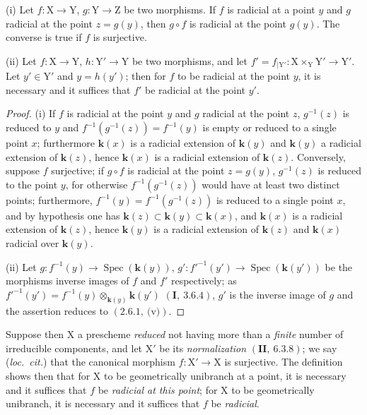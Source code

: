 \begin{lemma}[6.15.3.1]
\label{IV.6.15.3.1}
(i) Let $f:\mathrm{X}\to\mathrm{Y}$, $g:\mathrm{Y}\to\mathrm{Z}$ be two morphisms. If $f$ is radicial
at a point $y$ and $g$ radicial at the point $z=g(y)$, then $g\circ f$ is radicial at the point $g(y)$. The converse
is true if $f$ is surjective.

(ii) Let $f:\mathrm{X}\to\mathrm{Y}$, $h:\mathrm{Y}'\to\mathrm{Y}$ be two morphisms, and let $f'=f_{|\mathrm{Y}'}:\mathrm{X}\times_\mathrm{Y}\mathrm{Y}'\to\mathrm{Y}'$.
Let $y'\in\mathrm{Y}'$ and $y=h(y')$; then for $f$ to be radicial at the point $y$, it is necessary and it suffices that $f'$ be
radicial at the point $y'$.
\end{lemma}

\begin{proof}
(i) If $f$ is radicial at the point $y$ and $g$ radicial at the point $z$, $g^{-1}(z)$ is reduced to $y$ and
$f^{-1}(g^{-1}(z))=f^{-1}(y)$ is empty or reduced to a single point $x$; furthermore $\boldsymbol{k}(x)$ is a radicial extension
of $\boldsymbol{k}(y)$ and $\boldsymbol{k}(y)$ a radicial extension of $\boldsymbol{k}(z)$, hence $\boldsymbol{k}(x)$ is a radicial extension of $\boldsymbol{k}(z)$.
Conversely, suppose $f$ surjective; if $g\circ f$ is radicial at the point $z=g(y)$, $g^{-1}(z)$ is reduced
to the point $y$, for otherwise $f^{-1}(g^{-1}(z))$ would have at least two distinct points; furthermore,
$f^{-1}(y)=f^{-1}(g^{-1}(z))$ is reduced to a single point $x$, and by hypothesis one has $\boldsymbol{k}(z)\subset\boldsymbol{k}(y)\subset\boldsymbol{k}(x)$,
and $\boldsymbol{k}(x)$ is a radicial extension of $\boldsymbol{k}(z)$, hence $\boldsymbol{k}(y)$ is a radicial extension of $\boldsymbol{k}(z)$ and $\boldsymbol{k}(x)$ radicial over $\boldsymbol{k}(y)$.

(ii) Let $g:f^{-1}(y)\to\operatorname{Spec}(\boldsymbol{k}(y))$, $g':f'^{-1}(y')\to\operatorname{Spec}(\boldsymbol{k}(y'))$ be the morphisms
inverse images of \mbox{\ensuremath{f}} and $f'$ respectively; as $f'^{-1}(y')=f^{-1}(y)\otimes_{\boldsymbol{k}(y)}\boldsymbol{k}(y')$
$(\mathbf{I},~3.6.4)$, $g'$ is the inverse image of $g$ and the assertion reduces to $(2.6.1,~\text{(v)})$.
\end{proof}

Suppose then $\mathrm{X}$ a prescheme \emph{reduced} not having more than a \emph{finite} number of irreducible components,
and let $\mathrm{X}'$ be its \emph{normalization} $(\mathbf{II},~6.3.8)$; we say (\emph{loc.~cit.}) that the canonical morphism
$f:\mathrm{X}'\to\mathrm{X}$ is surjective. The definition  shows then that for $\mathrm{X}$ to be geometrically
unibranch at a point, it is necessary and it suffices that $f$ be \emph{radicial at this point}; for
$\mathrm{X}$ to be geometrically unibranch, it is necessary and it suffices that $f$ be \emph{radicial}.

